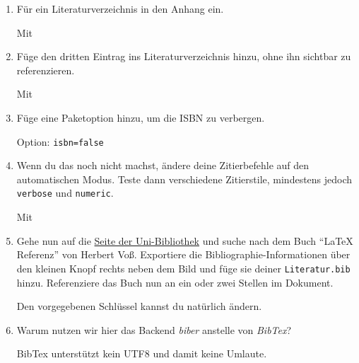 \begin{enumerate}
        \item Für ein Literaturverzeichnis in den Anhang ein.
            \begin{loesung}
                Mit 
            \end{loesung}
        
        \item Füge den dritten Eintrag ins Literaturverzeichnis hinzu, ohne ihn
            sichtbar zu referenzieren.
            \begin{loesung}
                Mit 
            \end{loesung}
        
        \item Füge eine Paketoption hinzu, um die ISBN zu verbergen.
            \begin{loesung}
                Option: \verb|isbn=false|
            \end{loesung}
        
        \item Wenn du das noch nicht machst, ändere deine Zitierbefehle auf den
            automatischen Modus. Teste dann verschiedene Zitierstile, mindestens
            jedoch \texttt{verbose} und \texttt{numeric}.
            \begin{loesung}
                Mit 
            \end{loesung}
        
        \item Gehe nun auf die \href{http://www.suub.uni-bremen.de/}{Seite der
            Uni-Bibliothek} und suche nach dem Buch \enquote{LaTeX Referenz}
            von Herbert Voß. Exportiere die Bibliographie-Informationen über den
            kleinen Knopf rechts neben dem Bild und füge sie deiner
            \texttt{Literatur.bib} hinzu. Referenziere das Buch nun an ein oder 
            zwei Stellen im Dokument.
            \begin{hinweis}
                Den vorgegebenen Schlüssel kannst du natürlich ändern.
            \end{hinweis}
        
        \item Warum nutzen wir hier das Backend \emph{biber} anstelle von
            \emph{BibTex}?
            \begin{loesung}
                BibTex unterstützt kein UTF8 und damit keine Umlaute.
            \end{loesung}
    \end{enumerate}
